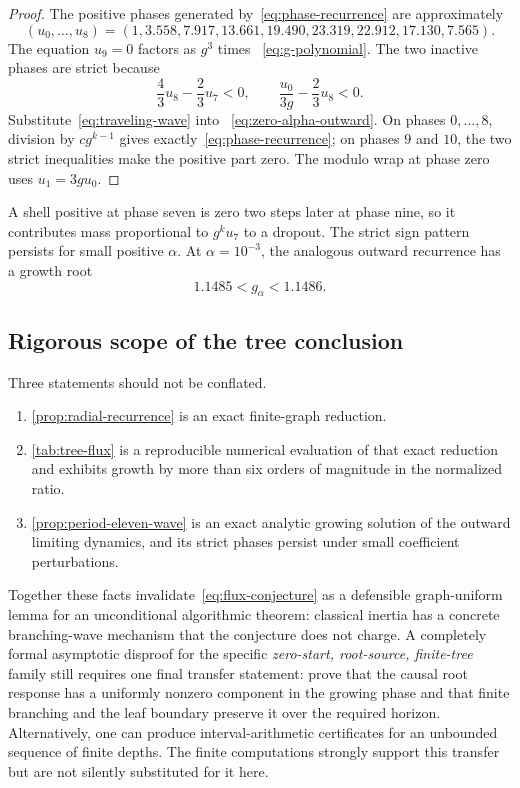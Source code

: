 \begin{proof}
The positive phases generated by~\eqref{eq:phase-recurrence} are
approximately
\[
 (u_0,\ldots,u_8)
 =(1,3.558,7.917,13.661,19.490,23.319,22.912,17.130,7.565).
\]
The equation $u_9=0$ factors as $g^3$ times
~\eqref{eq:g-polynomial}.  The two inactive phases are strict because
\[
 \frac43u_8-\frac23u_7<0,
 \qquad
 \frac{u_0}{3g}-\frac23u_8<0.
\]
Substitute~\eqref{eq:traveling-wave} into
~\eqref{eq:zero-alpha-outward}.  On phases $0,\ldots,8$, division by
$cg^{k-1}$ gives exactly~\eqref{eq:phase-recurrence}; on phases $9$ and $10$,
the two strict inequalities make the positive part zero.  The modulo wrap at
phase zero uses $u_1=3g u_0$.
\end{proof}

A shell positive at phase seven is zero two steps later at phase nine, so it
contributes mass proportional to $g^k u_7$ to a dropout.  The strict sign
pattern persists for small positive $\alpha$.  At $\alpha=10^{-3}$, the
analogous outward recurrence has a growth root
\begin{equation}
 1.1485<g_\alpha<1.1486.
 \label{eq:positive-alpha-growth}
\end{equation}

\subsection{Rigorous scope of the tree conclusion}

Three statements should not be conflated.
\begin{enumerate}[label=(\roman*),leftmargin=*]
  \item \cref{prop:radial-recurrence} is an exact finite-graph reduction.
  \item \cref{tab:tree-flux} is a reproducible numerical evaluation of that
  exact reduction and exhibits growth by more than six orders of magnitude in
  the normalized ratio.
  \item \cref{prop:period-eleven-wave} is an exact analytic growing solution
  of the outward limiting dynamics, and its strict phases persist under small
  coefficient perturbations.
\end{enumerate}

Together these facts invalidate~\eqref{eq:flux-conjecture} as a defensible
graph-uniform lemma for an unconditional algorithmic theorem: classical
inertia has a concrete branching-wave mechanism that the conjecture does not
charge.  A completely formal asymptotic disproof for the specific
\emph{zero-start, root-source, finite-tree} family still requires one final
transfer statement: prove that the causal root response has a uniformly
nonzero component in the growing phase and that finite branching and the leaf
boundary preserve it over the required horizon.  Alternatively, one can
produce interval-arithmetic certificates for an unbounded sequence of finite
depths.  The finite computations strongly support this transfer but are not
silently substituted for it here.
